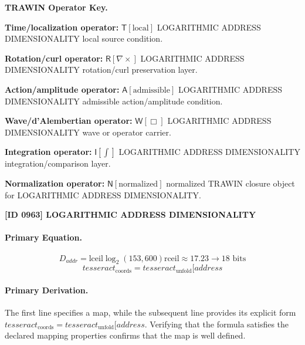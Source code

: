 \par\vspace{0.45\baselineskip}
\noindent\begin{minipage}[t]{\linewidth}
\begingroup
\small
\raggedright
\textbf{TRAWIN Operator Key.}\par
\noindent\textbf{Time/localization operator:} $\mathsf{T}\!\left[\mathrm{local}\right]$ LOGARITHMIC ADDRESS DIMENSIONALITY local source condition.\par
\noindent\textbf{Rotation/curl operator:} $\mathsf{R}\!\left[\nabla\times\right]$ LOGARITHMIC ADDRESS DIMENSIONALITY rotation/curl preservation layer.\par
\noindent\textbf{Action/amplitude operator:} $\mathsf{A}\!\left[\mathrm{admissible}\right]$ LOGARITHMIC ADDRESS DIMENSIONALITY admissible action/amplitude condition.\par
\noindent\textbf{Wave/d'Alembertian operator:} $\mathsf{W}\!\left[\Box\right]$ LOGARITHMIC ADDRESS DIMENSIONALITY wave or operator carrier.\par
\noindent\textbf{Integration operator:} $\mathsf{I}\!\left[\int\right]$ LOGARITHMIC ADDRESS DIMENSIONALITY integration/comparison layer.\par
\noindent\textbf{Normalization operator:} $\mathsf{N}\!\left[\mathrm{normalized}\right]$ normalized TRAWIN closure object for LOGARITHMIC ADDRESS DIMENSIONALITY.\par
\endgroup
\end{minipage}

\clearpage
\noindent\textbf{[ID 0963] LOGARITHMIC ADDRESS DIMENSIONALITY}\par
\vspace{0.35em}
\paragraph{Primary Equation.}
\[
D_{addr} = \mathrm{lceil} \log_2(153,600) \mathrm{rceil} \approx 17.23 \to 18 \text{ bits}
\]
\[
tesseract_{\mathrm{coords}} = tesseract_{\mathrm{unfold}}[address
\]

\paragraph{Primary Derivation.}
The first line specifies a map, while the subsequent line provides its explicit form \( tesseract_{\mathrm{coords}} = tesseract_{\mathrm{unfold}}[address \). Verifying that the formula satisfies the declared mapping properties confirms that the map is well defined.

